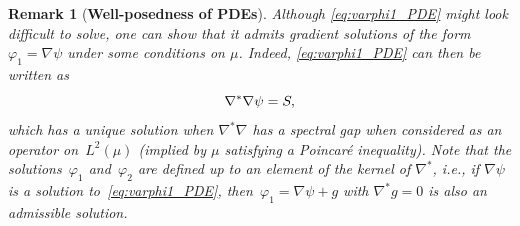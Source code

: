 \documentclass[11pt]{article}
\newtheorem{remark}{Remark}
\theoremstyle{definition}
\begin{document}
\begin{remark}[{\bf Well-posedness of PDEs}]
Although \eqref{eq:varphi1_PDE} might look difficult to solve, one can show that it admits gradient solutions of the form $\varphi_1 = \nabla\psi$ under some conditions on $\mu$. Indeed, \eqref{eq:varphi1_PDE} can then be written as
\begin{equation}
\notag
	\nabla^*\nabla \psi = S, 
	\end{equation}
which has a unique solution when $\nabla^*\nabla$ has a spectral gap when considered as an operator on~$L^2(\mu)$ (implied by $\mu$ satisfying a Poincar\'e inequality). Note that the solutions~$\varphi_1$ and~$\varphi_2$ are defined up to an element of the kernel of $\nabla^*$, i.e., if $\nabla\psi$ is a solution to~\eqref{eq:varphi1_PDE}, then~$\varphi_1 = \nabla\psi + g$ with $\nabla^*g = 0$ is also an admissible solution. \end{remark}
\end{document}
